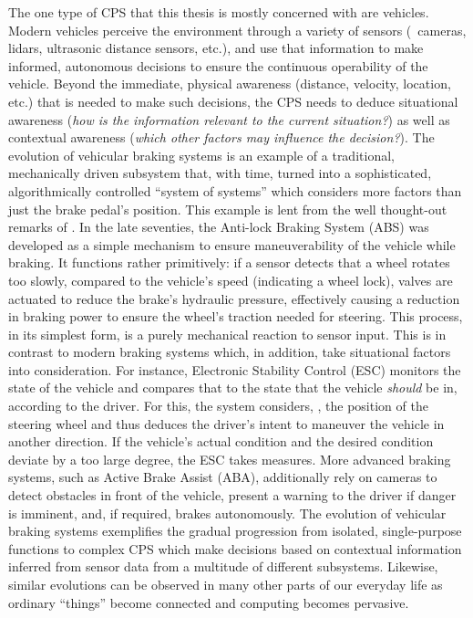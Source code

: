 The one type of CPS that this thesis is mostly concerned with are vehicles. Modern vehicles perceive the environment through a variety of sensors (\eg\ cameras, lidars, ultrasonic distance sensors, etc.), and use that information to make informed, autonomous decisions to ensure the continuous operability of the vehicle.
Beyond the immediate, physical awareness (distance, velocity, location, etc.) that is needed to make such decisions, the CPS needs to deduce situational awareness (\emph{how is the information relevant to the current situation?}) as well as contextual awareness (\emph{which other factors may influence the decision?}).
The evolution of vehicular braking systems is an example of a traditional, mechanically driven subsystem that, with time, turned into a sophisticated, algorithmically controlled ``system of systems'' which considers more factors than just the brake pedal's position. This example is lent from the well thought-out remarks of \citeauthor{broy2012cyber} \cite{broy2012cyber}.
In the late seventies, the Anti-lock Braking System (ABS) was developed as a simple mechanism to ensure maneuverability of the vehicle while braking. It functions rather primitively: if a sensor detects that a wheel rotates too slowly, compared to the vehicle's speed (indicating a wheel lock), valves are actuated to reduce the brake's hydraulic pressure, effectively causing a reduction in braking power to ensure the wheel's traction needed for steering. This process, in its simplest form, is a purely mechanical reaction to sensor input.
This is in contrast to modern braking systems which, in addition, take situational factors into consideration. For instance, Electronic Stability Control (ESC) monitors the state of the vehicle and compares that to the state that the vehicle \emph{should} be in, according to the driver. For this, the system considers, \eg , the position of the steering wheel and thus deduces the driver's intent to maneuver the vehicle in another direction. If the vehicle's actual condition and the desired condition deviate by a too large degree, the ESC takes measures. More advanced braking systems, such as Active Brake Assist (ABA), additionally rely on cameras to detect obstacles in front of the vehicle, present a warning to the driver if danger is imminent, and, if required, brakes autonomously.
The evolution of vehicular braking systems exemplifies the gradual progression from isolated, single-purpose functions to complex CPS which make decisions based on contextual information inferred from sensor data from a multitude of different subsystems. Likewise, similar evolutions can be observed in many other parts of our everyday life as ordinary ``things'' become connected and computing becomes pervasive.

